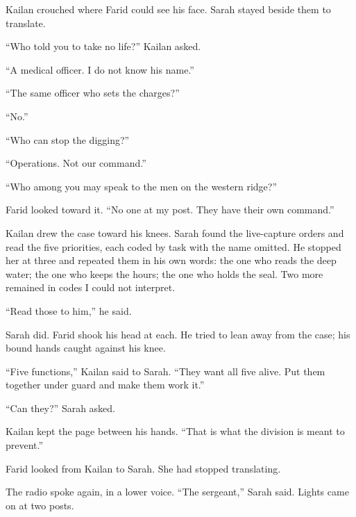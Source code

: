 Kailan crouched where Farid could see his face. Sarah stayed beside them to translate.\par

``Who told you to take no life?'' Kailan asked.\par

``A medical officer. I do not know his name.''\par

``The same officer who sets the charges?''\par

``No.''\par

``Who can stop the digging?''\par

``Operations. Not our command.''\par

``Who among you may speak to the men on the western ridge?''\par

Farid looked toward it. ``No one at my post. They have their own command.''\par

Kailan drew the case toward his knees. Sarah found the live-capture orders and read the five priorities, each coded by task with the name omitted. He stopped her at three and repeated them in his own words: the one who reads the deep water; the one who keeps the hours; the one who holds the seal. Two more remained in codes I could not interpret.\par

``Read those to him,'' he said.\par

Sarah did. Farid shook his head at each. He tried to lean away from the case; his bound hands caught against his knee.\par

``Five functions,'' Kailan said to Sarah. ``They want all five alive. Put them together under guard and make them work it.''\par

``Can they?'' Sarah asked.\par

Kailan kept the page between his hands. ``That is what the division is meant to prevent.''\par

Farid looked from Kailan to Sarah. She had stopped translating.\par

The radio spoke again, in a lower voice. ``The sergeant,'' Sarah said. Lights came on at two posts.\par

